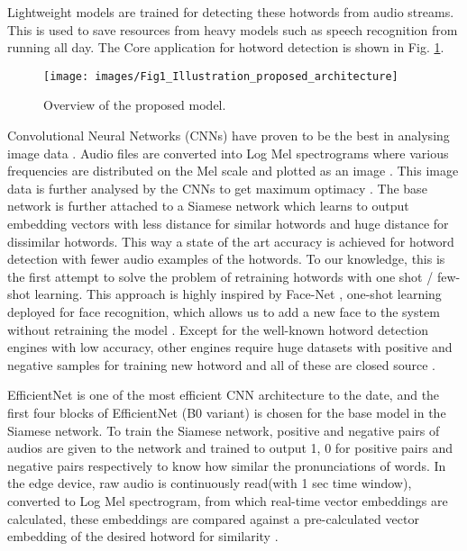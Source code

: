 \documentclass[10pt,twocolumn]{article}
\begin{document}
Lightweight models \cite{Yang_Jee_Leblanc_Weaver_Armand_2020} are trained for detecting these hotwords from audio streams. This is used to save resources from heavy models such as speech recognition from running all day. The Core application for hotword detection is shown in Fig. \ref{FIG:Illustration_of_the_proposed_architecture}.


\begin{figure}
\centering
\texttt{[image: images/Fig1\_Illustration\_proposed\_architecture]}
\caption{Overview of the proposed model.}
\label{FIG:Illustration_of_the_proposed_architecture}
\end{figure}

Convolutional Neural Networks (CNNs) have proven to be the best in analysing image data \cite{Hershey_2017}. Audio files are converted into Log Mel spectrograms where various frequencies are distributed on the Mel scale and plotted as an image \cite{Atsavasirilert_2019,9413528}. This image data is further analysed by the CNNs to get maximum optimacy \cite{Hershey_2017}. The base network is further attached to a Siamese network which learns to output embedding vectors with less distance for similar hotwords and huge distance for dissimilar hotwords. This way a state of the art accuracy is achieved for hotword detection with fewer audio examples of the hotwords. To our knowledge, this is the first attempt to solve the problem of retraining hotwords with one shot / few-shot learning. This approach is highly inspired by Face-Net \cite{Schroff_2015}, one-shot learning deployed for face recognition, which allows us to add a new face to the system without retraining the model \cite{Schroff_2015}. Except for the well-known hotword detection engines with low accuracy, other engines require huge datasets with positive and negative samples for training new hotword and all of these are closed source \cite{Yang_Jee_Leblanc_Weaver_Armand_2020,kalith_2012}. 

EfficientNet \cite{tan2020efficientnet} is one of the most efficient CNN architecture to the date, and the first four blocks of EfficientNet (B0 variant) is chosen for the base model in the Siamese network. To train the Siamese network, positive and negative pairs of audios are given to the network and trained to output 1, 0 for positive pairs and negative pairs respectively to know how similar the pronunciations of words. In the edge device, raw audio is continuously read(with 1 sec time window), converted to Log Mel spectrogram, from which real-time vector embeddings are calculated, these embeddings are compared against a pre-calculated vector embedding of the desired hotword for similarity \cite{Vargas_2020}.
\end{document}

